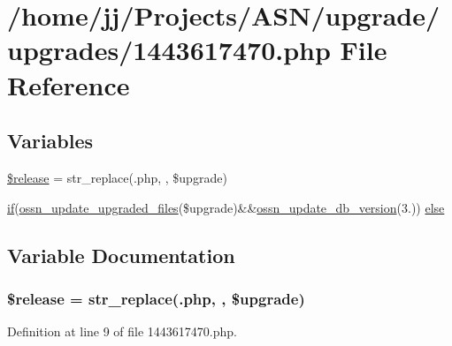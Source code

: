 \hypertarget{1443617470_8php}{}\section{/home/jj/\+Projects/\+A\+S\+N/upgrade/upgrades/1443617470.php File Reference}
\label{1443617470_8php}
\subsection*{Variables}
\begin{DoxyCompactItemize}
\item 
\hyperlink{1443617470_8php_a63c5d6a8a9f1768ea926cee666dc991b}{\$release} = str\+\_\+replace(\textquotesingle{}.php\textquotesingle{}, \textquotesingle{}\textquotesingle{}, \$upgrade)
\item 
\hyperlink{jquery_8tokeninput_8js_ad8dd46a3cbc004569e34401e9e71771a}{if}(\hyperlink{ossn_8lib_8upgrade_8php_af5e235e44fa65a589d768b2693399250}{ossn\+\_\+update\+\_\+upgraded\+\_\+files}(\$upgrade)\&\&\hyperlink{ossn_8lib_8upgrade_8php_aa7120e10a9c14b722b0e25c99bc86d92}{ossn\+\_\+update\+\_\+db\+\_\+version}(\textquotesingle{}3.\textquotesingle{})) \hyperlink{1443617470_8php_a45bb1de70d9b88b02ca0f5029326bf30}{else}
\end{DoxyCompactItemize}


\subsection{Variable Documentation}
\subsubsection[{\texorpdfstring{\$release}{$release}}]{\setlength{\rightskip}{0pt plus 5cm}\$release = str\+\_\+replace(\textquotesingle{}.php\textquotesingle{}, \textquotesingle{}\textquotesingle{}, \$upgrade)}\hypertarget{1443617470_8php_a63c5d6a8a9f1768ea926cee666dc991b}{}\label{1443617470_8php_a63c5d6a8a9f1768ea926cee666dc991b}


Definition at line 9 of file 1443617470.\+php.

